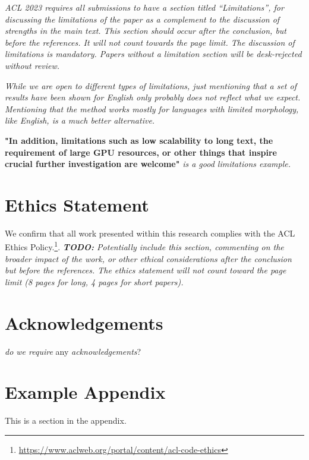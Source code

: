 \documentclass[11pt]{article}
\begin{document}
\textit{ACL 2023 requires all submissions to have a section titled ``Limitations'', for discussing the limitations of the paper as a complement to the discussion of strengths in the main text. This section should occur after the conclusion, but before the references. It will not count towards the page limit.
The discussion of limitations is mandatory. Papers without a limitation section will be desk-rejected without review.}

\textit{While we are open to different types of limitations, just mentioning that a set of results have been shown for English only probably does not reflect what we expect. 
Mentioning that the method works mostly for languages with limited morphology, like English, is a much better alternative.}

\textbf{"In addition, limitations such as low scalability to long text, the requirement of large GPU resources, or other things that inspire crucial further investigation are welcome"} \textit{is a good limitations example.}

\section*{Ethics Statement}
We confirm that all work presented within this research complies with the ACL Ethics Policy.\footnote{\url{https://www.aclweb.org/portal/content/acl-code-ethics}}. \textit{\textbf{TODO:} Potentially include this section, commenting on the broader impact of the work, or other ethical considerations after the conclusion but before the references. The ethics statement will not count toward the page limit (8 pages for long, 4 pages for short papers).}

\section*{Acknowledgements}
\emph{do we require} any \emph{acknowledgements}?




\appendix

\section{Example Appendix}
\label{sec:appendix}

This is a section in the appendix.
\end{document}
